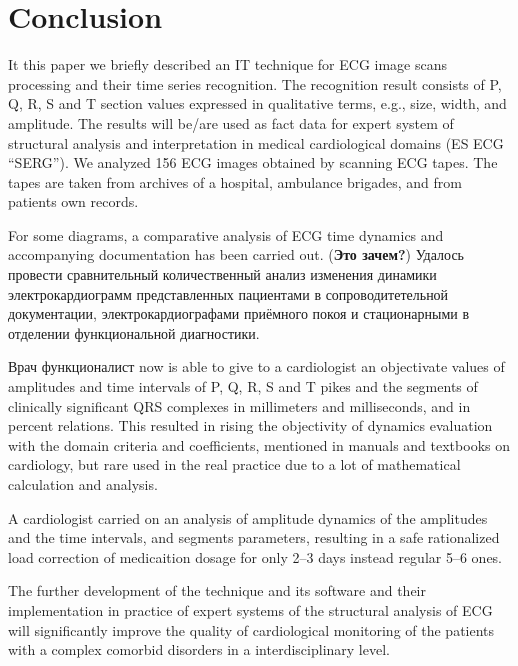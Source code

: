 \documentclass[runningheads]{AIIT}
\newcommand{\nnn}[2][rcolor]{\noindent%
\textcolor{eclr}{}\textcolor{#1}{#2}\textcolor{eclr}{}}
\begin{document}
\section*{Conclusion}
It this paper we briefly described an IT technique for ECG image scans processing and their time series recognition.  The recognition result consists of P, Q, R, S and T section values expressed in qualitative terms, e.g., size, width, and amplitude.  The results \nnn{will be/are} used as fact data for expert system of structural analysis and interpretation in medical cardiological domains (ES ECG ``SERG'').  We analyzed 156 ECG images obtained by scanning ECG tapes.  The tapes are taken from archives of a hospital, ambulance brigades, and from patients \nnn{own} records.

\nnn{For some diagrams, a comparative analysis of ECG time dynamics and accompanying documentation  has been carried out. (\textbf{Это зачем?}) Удалось провести сравнительный количественный анализ изменения динамики электрокардиограмм представленных пациентами в сопроводитетельной документации, электрокардиографами приёмного покоя и стационарными в отделении функциональной диагностики.}

Врач функционалист now is able to give to a cardiologist an objectivate values of amplitudes and time intervals of P, Q, R, S and T pikes and the segments of clinically significant QRS complexes in millimeters and milliseconds, and in percent relations.  This resulted in rising the objectivity of dynamics evaluation with the domain criteria and coefficients, mentioned in manuals and textbooks on cardiology, but rare used in the real practice due to a lot of mathematical calculation and analysis.

\nnn{A} cardiologist carried on an analysis of amplitude dynamics of the amplitudes and the time intervals, and segments parameters, resulting in a safe rationalized \nnn{load} correction of medicaition dosage for only 2--3 days instead regular 5--6 ones.

The further development of the technique and its software and their implementation in practice of expert systems of the structural analysis of ECG will significantly improve the quality of cardiological monitoring of the patients with a complex comorbid disorders \nnn{in a interdisciplinary level}.
\end{document}
